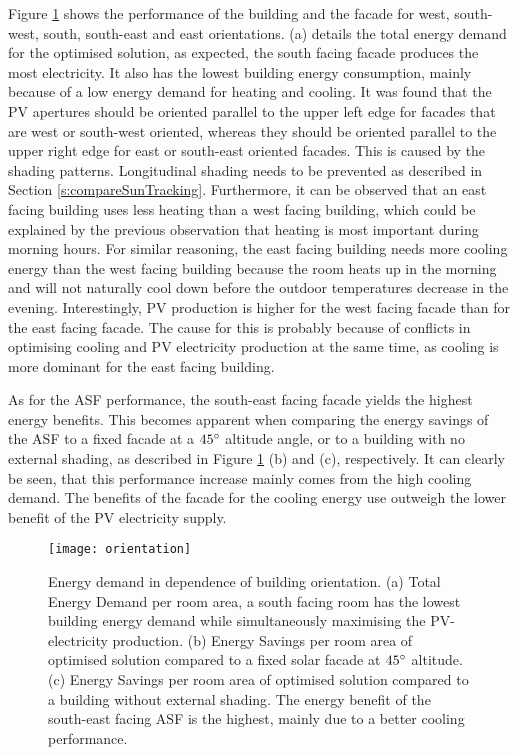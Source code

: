 	Figure \ref{fig:buildingOrientation} shows the performance of the building and the facade for west, south-west, south, south-east and east orientations. (a) details the total energy demand for the optimised solution, as expected, the south facing facade produces the most electricity. It also has the lowest building energy consumption, mainly because of a low energy demand for heating and cooling. It was found that the PV apertures should be oriented parallel to the upper left edge for facades that are west or south-west oriented, whereas they should be oriented parallel to the upper right edge for east or south-east oriented facades. This is caused by the shading patterns. Longitudinal shading needs to be prevented as described in Section \ref{s:compareSunTracking}. Furthermore, it can be observed that an east facing building uses less heating than a west facing building, which could be explained by the previous observation that heating is most important during morning hours. For similar reasoning, the east facing building needs more cooling energy than the west facing building because the room heats up in the morning and will not naturally cool down before the outdoor temperatures decrease in the evening. Interestingly, PV production is higher for the west facing facade than for the east facing facade. The cause for this is probably because of conflicts in optimising cooling and PV electricity production at the same time, as cooling is more dominant for the east facing building. 

	As for the ASF performance, the south-east facing facade yields the highest energy benefits. This becomes apparent when comparing the energy savings of the ASF to a fixed facade at a $45\degree$ altitude angle, or to a building with no external shading, as described in Figure \ref{fig:buildingOrientation} (b) and (c), respectively. It can clearly be seen, that this performance increase mainly comes from the high cooling demand. The benefits of the facade for the cooling energy use outweigh the lower benefit of the PV electricity supply. 

	\begin{figure*}
		\begin{center}
		\texttt{[image: orientation]}
		\caption{Energy demand in dependence of building orientation. (a) Total Energy Demand per room area, a south facing room has the lowest building energy demand while simultaneously maximising the PV-electricity production. (b) Energy Savings per room area of optimised solution compared to a fixed solar facade at $45\degree$ altitude. (c) Energy Savings per room area of optimised solution compared to a building without external shading. The energy benefit of the south-east facing ASF is the highest, mainly due to a better cooling performance.}
		\label{fig:buildingOrientation}
		\end{center}
	\end{figure*}

